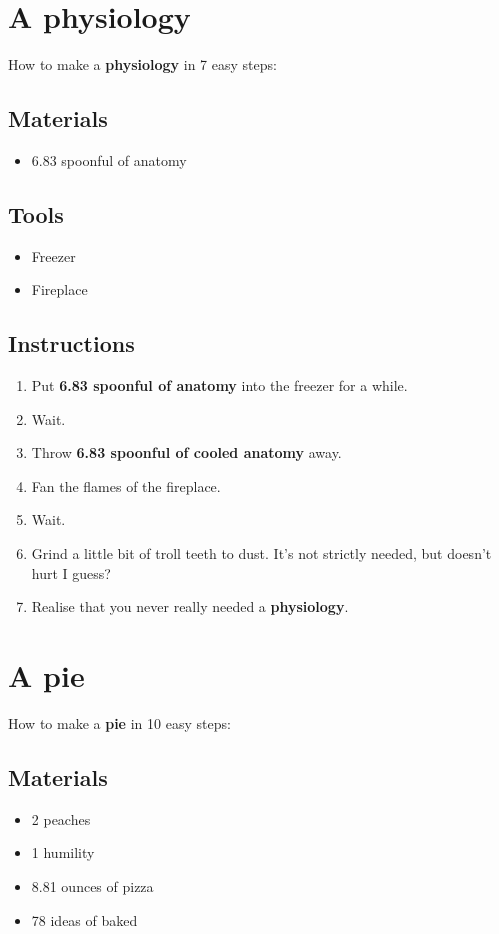 \documentclass{article}
\begin{document}
\section{A physiology}How to make a \textbf{physiology} in 7 easy steps:

\subsection{Materials}\begin{itemize}
\item 
6.83 spoonful of anatomy
\end{itemize}
\subsection{Tools}\begin{itemize}
\item 
Freezer
\item 
Fireplace
\end{itemize}
\subsection{Instructions}\begin{enumerate}
\item 
Put \textbf{6.83 spoonful of anatomy} into the freezer for a while.
\item 
Wait.
\item 
Throw \textbf{6.83 spoonful of cooled anatomy} away.
\item 
Fan the flames of the fireplace.
\item 
Wait.
\item 
Grind a little bit of troll teeth to dust. It's not strictly needed, but doesn't hurt I guess?
\item 
Realise that you never really needed a \textbf{physiology}.
\end{enumerate}
\newpage
\section{A pie}How to make a \textbf{pie} in 10 easy steps:

\subsection{Materials}\begin{itemize}
\item 
2 peaches
\item 
1 humility
\item 
8.81 ounces of pizza
\item 
78 ideas of baked
\end{itemize}
\end{document}
